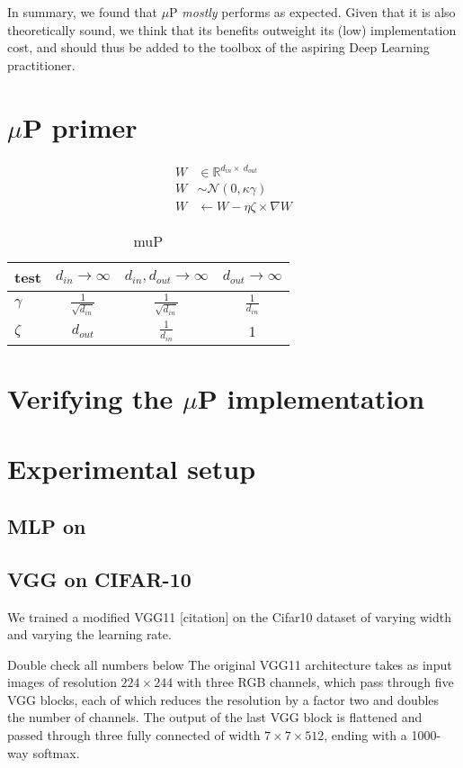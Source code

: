 \documentclass{article}
\begin{document}
In summary, we found that $\mu$P \textit{mostly} performs as expected. Given that it is also theoretically sound, we think that its benefits outweight its (low) implementation cost, and should thus be added to the toolbox of the aspiring Deep Learning practitioner.

\section{$\mu$P primer}

\begin{align}
    W &\in\mathbb{R}^{d_{in}\times\ d_{out}}\\
    W &\sim \mathcal{N}(0, \kappa\gamma)\\
    W &\leftarrow W - \eta \zeta \times \nabla W
\end{align}

\begin{table}
\Centering
\caption{muP}
\begin{tabular}{lccc}
\hline
test & $d_{in}\to\infty$ & $d_{in},d_{out}\to\infty$ & $d_{out}\to\infty$ \\
\hline
$\gamma$ & $\frac{1}{\sqrt{d_{in}}}$ & $\frac{1}{\sqrt{d_{in}}}$ & $\frac{1}{d_{in}}$ \\ 
    $\zeta$ & $d_{out}$ & $\frac{1}{d_{in}}$ & 1 \\
\hline
\end{tabular}
\end{table}

\section{Verifying the $\mu$P implementation}

\section{Experimental setup}

\subsection{MLP on}

\subsection{VGG on CIFAR-10}
We trained a modified VGG11 {\color{red}[citation]} on the Cifar10 dataset of varying width and varying the learning rate.

{\color{red} Double check all numbers below}
The original VGG11 architecture takes as input images of resolution $224\times244$ with three RGB channels, which pass through five VGG blocks, each of which reduces the resolution by a factor two and doubles the number of channels. The output of the last VGG block is flattened and passed through three fully connected of width $7\times7\times512$, ending with a 1000-way softmax.
\end{document}
